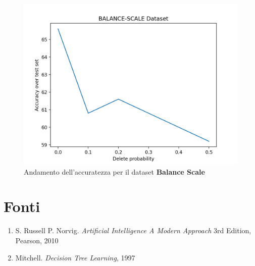 \documentclass[a4paper, 10pt]{article}
\begin{document}
\begin{figure}[h]
\centering
\includegraphics[scale=0.3,angle=0]{balance_scale.png}
\caption{Andamento dell'accuratezza per il dataset \textbf{Balance Scale}}
\end{figure}
\section{Fonti}
\begin{enumerate}
\item[]S. Russell P. Norvig. \textit{Artificial Intelligence A Modern Approach} 3rd Edition, Pearson, 2010
\item[]Mitchell. \textit{Decision Tree Learning}, 1997
\end{enumerate}
\end{document}
